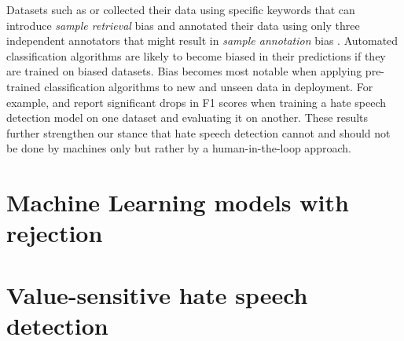 %
Datasets such as \citet{waseem2016hateful} or \citet{basile2019semeval} collected their data using specific keywords that can introduce \textit{sample retrieval} bias and annotated their data using only three independent annotators that might result in \textit{sample annotation} bias \citep{balayn2021automatic}.
%
Automated classification algorithms are likely to become biased in their predictions if they are trained on biased datasets.
%
Bias becomes most notable when applying pre-trained classification algorithms to new and unseen data in deployment.
%
For example, \citet{grondahl2018all} and \citet{arango2019hate} report significant drops in F1 scores when training a hate speech detection model on one dataset and evaluating it on another.
%
These results further strengthen our stance that hate speech detection cannot and should not be done by machines only but rather by a human-in-the-loop approach.


\section{Machine Learning models with rejection}


\section{Value-sensitive hate speech detection}

